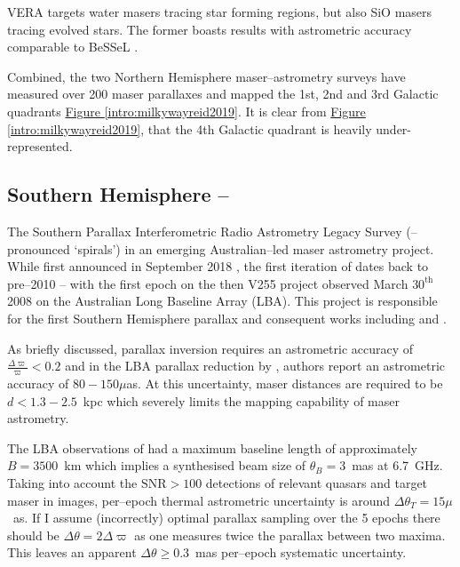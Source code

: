		VERA targets water masers tracing star forming regions, but also SiO masers tracing evolved stars. The former boasts results with astrometric accuracy comparable to BeSSeL \citep{Reid2019,vera2020}.
		
		Combined, the two Northern Hemisphere maser--astrometry surveys have measured over 200 maser parallaxes and mapped the 1st, 2nd and 3rd Galactic quadrants \hyperref[intro:milkywayreid2019]{Figure \ref*{intro:milkywayreid2019}}. It is clear from \hyperref[intro:milkywayreid2019]{Figure \ref*{intro:milkywayreid2019}}, that the 4th Galactic quadrant is heavily under-represented. 
	
		\subsection{Southern Hemisphere -- \spirals} \label{sec:spirals}
        The Southern Parallax Interferometric Radio Astrometry Legacy Survey (\spirals -- pronounced `spirals') in an emerging Australian--led maser astrometry project. While first announced in September 2018 \citep[at the Cagliari Maser IAUS; ][]{Hyland2018}, the first iteration of \spirals dates back to pre--2010 -- with the first epoch on the then V255 project observed March $30^\text{th}$ 2008 on the Australian Long Baseline Array (LBA). %
        This project is responsible for the first Southern Hemisphere parallax \citep{Krishnan2015} and consequent works including \citet{Krishnan2017} and \citet{Sanna2015}.
        
        As briefly discussed, parallax inversion requires an astrometric accuracy of $\frac{\Delta\varpi}{\varpi}<0.2$ and in the LBA parallax reduction by \citet{Krishnan2015,Krishnan2017}, authors report an astrometric accuracy of $80-150\mu$as. At this uncertainty, maser distances are required to be $d<1.3-2.5$~kpc which severely limits the mapping capability of maser astrometry. 
        
        The LBA observations of \citet{Krishnan2015,Krishnan2017} had a maximum baseline length of approximately $B=3500$~km which implies a synthesised beam size of $\theta_B=3$~mas at 6.7~GHz. Taking into account the $\text{SNR}>100$ detections of relevant quasars and target maser in images, per--epoch thermal astrometric uncertainty \citep[$\Delta\theta_T\approx \frac{1}{2}\frac{\theta_B}{SNR}$;][]{ReidHonma2014} is around $\Delta\theta_T=15\mu$~as. If I assume (incorrectly) optimal parallax sampling over the 5 epochs there should be $\Delta\theta=2\Delta\varpi$ as one measures twice the parallax between two maxima. This leaves an apparent $\Delta\theta\ge0.3$~mas per--epoch systematic uncertainty.
        
